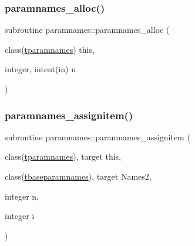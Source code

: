 \mbox{\label{namespaceparamnames_a3e5401d3e44bed7bfdeed12938fa58fa}} 
\subsubsection{\texorpdfstring{paramnames\+\_\+alloc()}{paramnames\_alloc()}}
{\footnotesize\ttfamily subroutine paramnames\+::paramnames\+\_\+alloc (\begin{DoxyParamCaption}\item[{class(\mbox{\hyperlink{structparamnames_1_1tparamnames}{tparamnames}})}]{this,  }\item[{integer, intent(in)}]{n }\end{DoxyParamCaption})\hspace{0.3cm}{\ttfamily [private]}}

\mbox{\label{namespaceparamnames_a00d55ae57c0418d420115dfef427565f}} 
\subsubsection{\texorpdfstring{paramnames\+\_\+assignitem()}{paramnames\_assignitem()}}
{\footnotesize\ttfamily subroutine paramnames\+::paramnames\+\_\+assignitem (\begin{DoxyParamCaption}\item[{class(\mbox{\hyperlink{structparamnames_1_1tparamnames}{tparamnames}}), target}]{this,  }\item[{class(\mbox{\hyperlink{structparamnames_1_1tbaseparamnames}{tbaseparamnames}}), target}]{Names2,  }\item[{integer}]{n,  }\item[{integer}]{i }\end{DoxyParamCaption})\hspace{0.3cm}{\ttfamily [private]}}

\mbox{\label{namespaceparamnames_a16117a38b771ac05b4b1655b1f2d78a8}} 
